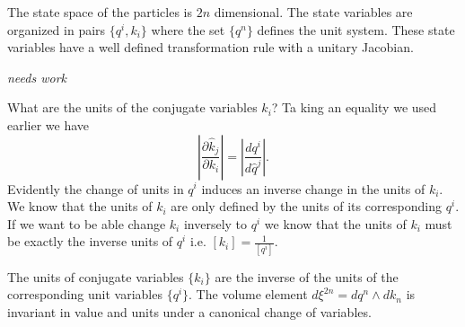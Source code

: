 \documentclass{article}
\begin{document}
\begin{prop}
	The state space of the particles is $2n$ dimensional. The state variables are organized in pairs $\{q^i, k_i\}$ where the set $\{q^n\}$ defines the unit system. These state variables have a well defined transformation rule with a unitary Jacobian.
\end{prop}

	
	\emph{needs work}	
	
	What are the units of the conjugate variables $k_i$? Ta king an equality we used earlier we have $$\left|\frac{\partial \hat{k}_j}{\partial k_i}\right| = \left|\frac{d q^i}{d \hat{q}^j}\right|.$$ Evidently the change of units in $q^i$ induces an inverse change in the units of $k_i$. We know that the units of $k_i$ are only defined by the units of its corresponding $q^i$. If we want to be able change $k_i$ inversely to $q^i$ we know that the units of $k_i$ must be exactly the inverse units of $q^i$ i.e. $[k_i] = \frac{1}{[q^i]}$.
	
\begin{prop}
	The units of conjugate variables $\{k_i\}$ are the inverse of the units of the corresponding unit variables $\{q^i\}$. The volume element $d\xi^{2n} = dq^n \land dk_n$ is invariant in value and units under a canonical change of variables.
\end{prop}
\end{document}
